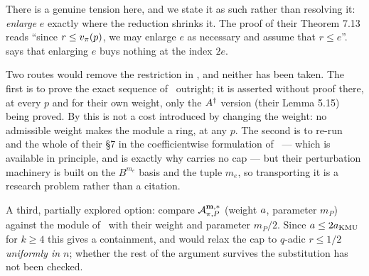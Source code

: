 There is a genuine tension here, and we state it as such rather than
resolving it: \cite{kramermillerupton2021newton} \emph{enlarge} $e$ exactly where the
reduction shrinks it. The proof of their Theorem 7.13 reads ``since $r \le
v_{\pi}(p)$, we may enlarge $e$ as necessary and assume that $r \le e$''.
 says that enlarging $e$ buys nothing at the index $2e$.

\begin{remark}
\label{rem:open-contact}
Two routes would remove the restriction in , and neither
has been taken. The first is to prove the exact sequence of~\cite[\S6.2]{kramermillerupton2021newton} outright; it is asserted without proof
there, at every $p$ and for their own weight, only the $A^{\dagger}$ version
(their Lemma 5.15) being proved. By  this is not a cost
introduced by changing the weight: no admissible weight makes the module a
ring, at any $p$. The second is to re-run~\cite[\S6.2]{kramermillerupton2021newton}
and the whole of their \S7 in the coefficientwise formulation of~\cite{kramermiller2020abelian} --- which is available in principle, and is
exactly why  carries no cap --- but their perturbation
machinery is built on the $B^{m_e}$ basis and the tuple $m_e$, so
transporting it is a research problem rather than a citation.

A third, partially explored option: compare $\mathcal{A}^{\mathbf{m},*}_{\pi,P}$ (weight $a$, parameter
$m_P$) against the module of~\cite{kramermillerupton2021newton} with their weight and
parameter $m_P/2$. Since $a \le 2a_{\mathrm{KMU}}$ for $k \ge 4$ this
gives a containment, and would relax the cap to $q$-adic $r \le 1/2$
\emph{uniformly in $n$}; whether the rest of the argument survives the
substitution has not been checked.
\end{remark}
